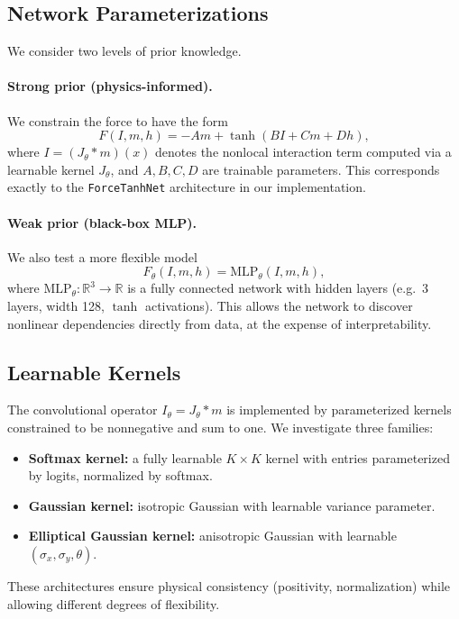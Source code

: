 \documentclass[11pt,a4paper]{article}
\begin{document}
\subsection{Network Parameterizations}
We consider two levels of prior knowledge.

\paragraph{Strong prior (physics-informed).}
We constrain the force to have the form
\begin{equation}
F(I,m,h) = -A m + \tanh(BI + C m + D h),
\label{eq:strong_prior}
\end{equation}
where $I=(J_\theta \ast m)(x)$ denotes the nonlocal interaction term computed via a learnable kernel $J_\theta$, 
and $A,B,C,D$ are trainable parameters. 
This corresponds exactly to the \texttt{ForceTanhNet} architecture in our implementation.

\paragraph{Weak prior (black-box MLP).}
We also test a more flexible model
\begin{equation}
F_\theta(I,m,h) = \text{MLP}_\theta(I,m,h),
\end{equation}
where $\text{MLP}_\theta:\mathbb{R}^3 \to \mathbb{R}$ is a fully connected network with hidden layers (e.g.\ 3 layers, width 128, $\tanh$ activations). 
This allows the network to discover nonlinear dependencies directly from data, at the expense of interpretability.

\subsection{Learnable Kernels}
The convolutional operator $I_\theta = J_\theta \ast m$ is implemented by parameterized kernels constrained to be nonnegative and sum to one. 
We investigate three families:
\begin{itemize}
  \item \textbf{Softmax kernel:} a fully learnable $K\times K$ kernel with entries parameterized by logits, normalized by softmax.
  \item \textbf{Gaussian kernel:} isotropic Gaussian with learnable variance parameter.
  \item \textbf{Elliptical Gaussian kernel:} anisotropic Gaussian with learnable $(\sigma_x, \sigma_y, \theta)$.
\end{itemize}
These architectures ensure physical consistency (positivity, normalization) while allowing different degrees of flexibility.
\end{document}
